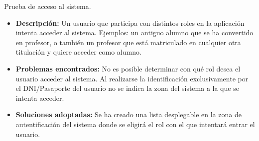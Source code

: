 \item Prueba de acceso al sistema.
  \begin{itemize}
    \item \textbf{Descripción:} Un usuario que participa con distintos roles en
      la aplicación intenta acceder al sistema. Ejemplos: un antiguo alumno que
      se ha convertido en profesor, o también un profesor que está matriculado
      en cualquier otra titulación y quiere acceder como alumno.
    \item \textbf{Problemas encontrados:} No es posible determinar con qué rol
      desea el usuario acceder al sistema. Al realizarse la identificación
      exclusivamente por el DNI/Pasaporte del usuario no se indica la zona del
      sistema a la que se intenta acceder.
    \item \textbf{Soluciones adoptadas:} Se ha creado una lista desplegable
      en la zona de autentificación del sistema donde se eligirá el rol con
      el que intentará entrar el usuario.
  \end{itemize}

